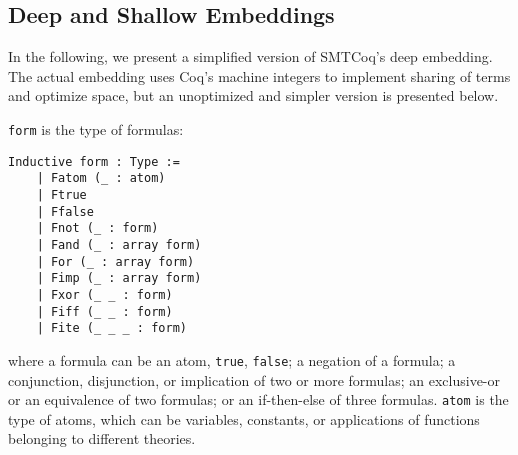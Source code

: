 \documentclass{article}
\begin{document}
	\subsection{Deep and Shallow Embeddings}
	In the following, we present 
	a simplified version of SMTCoq's 
	deep embedding. The actual embedding 
	uses Coq's machine integers to 
	implement sharing of terms and 
	optimize space, but an unoptimized 
	and simpler version is presented 
	below. 
	
	\texttt{form} is the type of 
	formulas:
	\begin{verbatim}
Inductive form : Type :=
	| Fatom (_ : atom)
	| Ftrue
	| Ffalse
	| Fnot (_ : form)
	| Fand (_ : array form)
	| For (_ : array form)
	| Fimp (_ : array form)
	| Fxor (_ _ : form)
	| Fiff (_ _ : form)
	| Fite (_ _ _ : form)
	\end{verbatim}
	where a formula can be an atom, 
	\texttt{true}, \texttt{false};
	a negation of a formula; a 
	conjunction, disjunction, or 
	implication of two or more 
	formulas; an exclusive-or or
	an equivalence of two formulas; 
	or an if-then-else of three formulas.
	\texttt{atom} is the type of atoms, 
	which can be variables, 
	constants, or applications of 
	functions belonging to 
	different theories.
	
\end{document}

